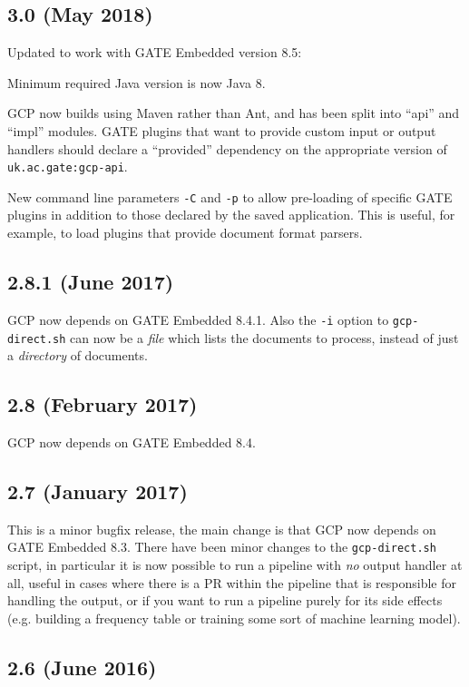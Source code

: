 \subsection{3.0 (May 2018)}

Updated to work with GATE Embedded version 8.5:
\bit
\item Minimum required Java version is now Java 8.
\item GCP now builds using Maven rather than Ant, and has been split into
  ``api'' and ``impl'' modules. GATE plugins that want to provide custom input
  or output handlers should declare a ``provided'' dependency on the
  appropriate version of \verb!uk.ac.gate:gcp-api!.
\item New command line parameters \verb!-C! and \verb!-p! to allow pre-loading
  of specific GATE plugins in addition to those declared by the saved
  application.  This is useful, for example, to load plugins that provide
  document format parsers.
\eit

\subsection{2.8.1 (June 2017)}

GCP now depends on GATE Embedded 8.4.1.  Also the \verb!-i! option to
\verb!gcp-direct.sh! can now be a \emph{file} which lists the documents to
process, instead of just a \emph{directory} of documents.

\subsection{2.8 (February 2017)}

GCP now depends on GATE Embedded 8.4.

\subsection{2.7 (January 2017)}

This is a minor bugfix release, the main change is that GCP now depends on GATE
Embedded 8.3.  There have been minor changes to the \verb!gcp-direct.sh! script,
in particular it is now possible to run a pipeline with \emph{no} output
handler at all, useful in cases where there is a PR within the pipeline that is
responsible for handling the output, or if you want to run a pipeline purely
for its side effects (e.g. building a frequency table or training some sort of
machine learning model).

\subsection{2.6 (June 2016)}

